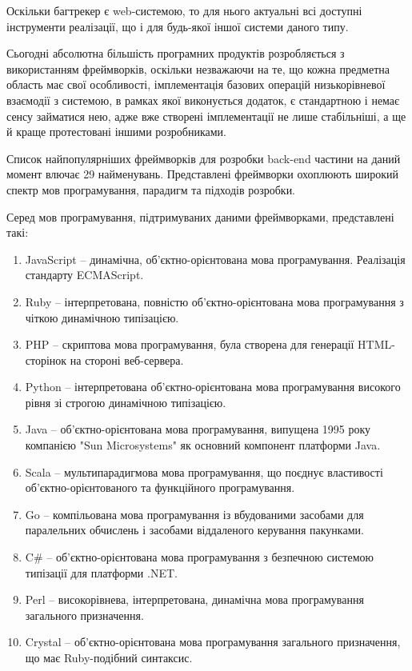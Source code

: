 \documentclass[../main.tex]{subfiles}
\begin{document}
Оскільки багтрекер є web-системою, то для нього актуальні всі доступні інструменти реалізації, що і для будь-якої іншої системи даного типу.

Сьогодні абсолютна більшість програмних продуктів розробляється з використанням фреймворків, оскільки незважаючи на те, що кожна предметна область має свої особливості, імплементація базових операцій низькорівневої взаємодії з системою, в рамках якої виконується додаток, є стандартною і немає сенсу займатися нею, адже вже створені імплементації не лише стабільніші, а ще й краще протестовані іншими розробниками.

Список найпопулярніших фреймворків для розробки back-end частини \cite{web_app_frameworks} на даний момент влючає 29 найменувань. Представлені фреймворки охоплюють широкий спектр мов програмування, парадигм та підходів розробки.

Серед мов програмування, підтримуваних даними фреймворками, представлені такі:
\begin{enumerate}
    \item JavaScript -- динамічна, об'єктно-орієнтована мова програмування. Реалізація стандарту ECMAScript.
    \item Ruby -- інтерпретована, повністю об'єктно-орієнтована мова програмування з чіткою динамічною типізацією.
    \item PHP -- скриптова мова програмування, була створена для генерації HTML-сторінок на стороні веб-сервера.
    \item Python -- інтерпретована об'єктно-орієнтована мова програмування високого рівня зі строгою динамічною типізацією.
    \item Java -- об'єктно-орієнтована мова програмування, випущена 1995 року компанією "Sun Microsystems" як основний компонент платформи Java.
    \item Scala -- мультипарадигмова мова програмування, що поєднує властивості об'єктно-орієнтованого та функційного програмування.
    \item Go -- компільована мова програмування із вбудованими засобами для паралельних обчислень і засобами віддаленого керування пакунками.
    \item C\# -- об'єктно-орієнтована мова програмування з безпечною системою типізації для платформи .NET.
    \item Perl -- високорівнева, інтерпретована, динамічна мова програмування загального призначення.
    \item Crystal -- об'єктно-орієнтована мова програмування загального призначення, що має Ruby-подібний синтаксис.
\end{enumerate}
\end{document}
